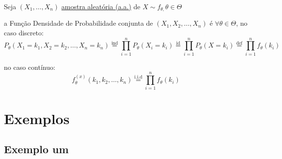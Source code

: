 \documentclass[
  letterpaper,
  DIV=11,
  numbers=noendperiod]{scrreprt}
\begin{document}
Seja \((X_{1},\dots,X_{n})\) \hyperref[sec-aa]{amostra aleatória (a.a.)}
de \(X\sim f_{\theta,}\theta \in \Theta\)

a Função Densidade de Probabilidade conjunta de
\((X_{1}, X_{2},\dots,X_{n})\) é \(\forall \theta \in \Theta\), no caso
discreto: \[
P_\theta(X_{1}=k_{1}, X_{2}=k_{2},\dots,X_{n}= k_{n})\stackrel{\text{ind}}{=}\prod^{n}_{i=1}P_\theta(X_{i}=k_{i})
\stackrel{\text{id}}{=}\prod^{n}_{i=1}P_\theta(X=k_{i})\stackrel{\text{def}}{=}\prod^{n}_{i=1}f_\theta(k_{i})
\]

no caso contínuo: \[
f_\theta^{(x)}(k_{1},k_{2},\dots,k_{n})\stackrel{\text{i.i.d}}{=}\prod^{n}_{i=1}f_{\theta}(k_{i})
\]

\section{Exemplos}\label{exemplos-1}

\subsection{Exemplo um}\label{exemplo-um}
\end{document}
